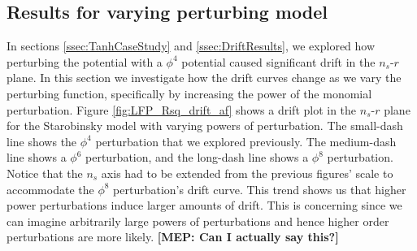 \documentclass[a4paper,11pt]{article}
\def\nsr{$n_s$-$r$ }
\newcommand{\mep}[1]{{\color{applegreen} \textbf{[MEP:  #1]}}}
\begin{document}


\FloatBarrier
\subsection{Results for varying perturbing model}
\label{ssec:DriftVaryAf}

In sections \ref{ssec:TanhCaseStudy} and \ref{ssec:DriftResults}, we explored how perturbing the potential with a $\phi^4$ potential caused significant drift in the \nsr plane. In this section we investigate how the drift curves change as we vary the perturbing function, specifically by increasing the power of the monomial perturbation. Figure \ref{fig:LFP_Rsq_drift_af} shows a drift plot in the \nsr plane for the Starobinsky model with varying powers of perturbation. The small-dash line shows the $\phi^4$ perturbation that we explored previously. The medium-dash line shows a $\phi^6$ perturbation, and the long-dash line shows a $\phi^8$ perturbation. Notice that the $n_s$ axis had to be extended from the previous figures' scale to accommodate the $\phi^8$ perturbation's drift curve. This trend shows us that higher power perturbations induce larger amounts of drift. This is concerning since we can imagine arbitrarily large powers of perturbations and hence higher order perturbations are more likely. \mep{Can I actually say this?} 
\end{document}
